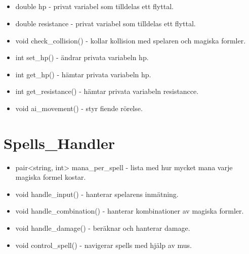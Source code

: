 \documentclass{TDP005mall}
\begin{document}
\subsection{}

\begin{itemize}

    \item double hp - privat variabel som tilldelas ett flyttal. 
    \item double resistance - privat variabel som tilldelas ett flyttal.
    \item void check\_collision() - kollar kollision med spelaren och magiska formler. 
    \item int set\_hp() - ändrar privata variabeln hp.
    \item int get\_hp() - hämtar privata variabeln hp.
    \item int get\_resistance() - hämtar privata variabeln resistancce.
    \item void ai\_movement() - styr fiende rörelse. 
    
\end{itemize}

\section{Spells\_Handler}

\begin{itemize}

    \item pair<string, int> mana\_per\_spell - lista med hur mycket mana varje magiska formel kostar. 
    \item void handle\_input() - hanterar spelarens inmätning. 
    \item void handle\_combination() - hanterar kombinationer av magiska     formler. 
    \item void handle\_damage() - beräknar och hanterar damage. 
    \item void control\_spell() - navigerar spells med hjälp av mus. 
    
\end{itemize}
\end{document}
